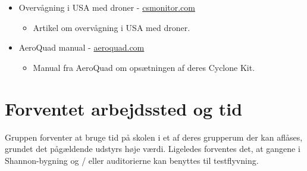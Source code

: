 \documentclass[Main]{subfiles}
\begin{document}
\begin{itemize}
	\item Overvågning i USA med droner - \href{http://www.csmonitor.com/USA/Society/2013/0313/Drones-over-America-public-safety-benefit-or-creepy-privacy-threat}{csmonitor.com}
	
		\begin{itemize}
		\item Artikel om overvågning i USA med droner.
		\end{itemize}
			
	
	\item AeroQuad manual - \href{http://aeroquad.com/showwiki.php?title=Book:AeroQuad+Manual}{aeroquad.com}
	
		\begin{itemize}
		\item Manual fra AeroQuad om opsætningen af deres Cyclone Kit.
		\end{itemize}
	

	\end{itemize}



\section{Forventet arbejdssted og tid}

Gruppen forventer at bruge tid på skolen i et af deres grupperum der kan aflåses, grundet det pågældende udstyrs høje værdi.
Ligeledes forventes det, at gangene i Shannon-bygning og / eller auditorierne kan benyttes til testflyvning.
\end{document}
